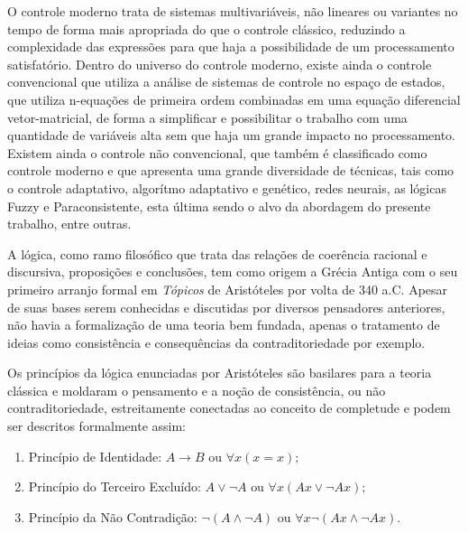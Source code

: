 
O controle moderno trata de sistemas multivariáveis, 
não lineares ou variantes no tempo 
de forma mais apropriada do que o controle clássico, 
reduzindo a complexidade das expressões para que 
haja a possibilidade de um processamento satisfatório.
Dentro do universo do controle moderno, 
existe ainda o controle convencional que utiliza a 
análise de sistemas de controle no espaço de estados, 
que utiliza n-equações de primeira ordem 
combinadas em uma equação diferencial vetor-matricial, 
de forma a simplificar e possibilitar 
o trabalho com uma quantidade de variáveis alta 
sem que haja um grande impacto no processamento.  
\cite{Ogata} 
Existem ainda o controle não convencional, 
que também é classificado como controle moderno e que
apresenta uma grande diversidade de técnicas, 
tais como o controle adaptativo, 
algorítmo adaptativo e genético, 
redes neurais, 
as lógicas Fuzzy e Paraconsistente, 
esta última sendo o alvo da abordagem do presente trabalho, 
entre outras.


A lógica, como ramo filosófico que trata das 
relações de coerência racional e discursiva, proposições e conclusões, 
tem como origem a Grécia Antiga com o seu primeiro arranjo formal em 
\emph{Tópicos} de Aristóteles por volta de 340 a.C. 
Apesar de suas bases serem conhecidas e discutidas por 
diversos pensadores anteriores, 
não havia a formalização de uma teoria bem fundada, 
apenas o tratamento de ideias como 
consistência e consequências da contraditoriedade por exemplo. 

Os princípios da lógica enunciadas por Aristóteles são 
basilares para a teoria clássica e 
moldaram o pensamento e a noção de consistência, ou não contraditoriedade, 
estreitamente conectadas ao conceito de completude e 
podem ser descritos formalmente assim:


\begin{enumerate}
\item Princípio de Identidade: 
    \begin{math}
	A \rightarrow B 
	\textrm{ ou } 
	\forall x(x=x);
    \end{math}

\item Princípio do Terceiro Excluído:
    \begin{math}
	A \vee \neg A
	\textrm{ ou }
	\forall x(Ax \vee \neg Ax);
    \end{math}

\item Princípio da Não Contradição: 
    \begin{math}
	\neg (A \wedge \neg A)
	\textrm{ ou }
	\forall x\neg(Ax \wedge \neg Ax).
    \end{math}

\end{enumerate}

